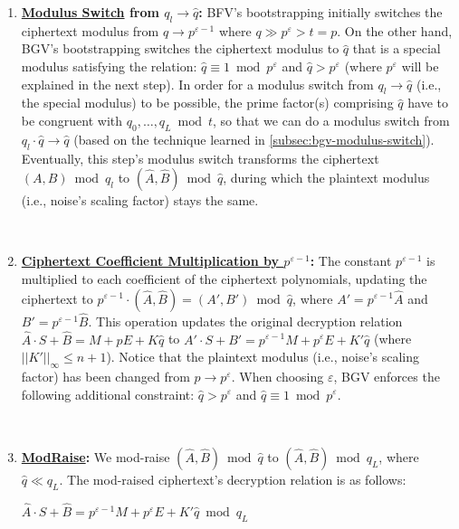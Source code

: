 \begin{enumerate}

\item \textbf{\underline{Modulus Switch} from \boldmath$q_l \rightarrow \hat{q}$:} BFV's bootstrapping initially switches the ciphertext modulus from $q \rightarrow p^{\varepsilon-1}$ where $q \gg p^\varepsilon > t = p$. On the other hand, BGV's bootstrapping switches the ciphertext modulus to $\hat{q}$ that is a special modulus satisfying the relation: $\hat{q} \equiv 1 \bmod p^\varepsilon$ and $\hat{q} > p^\varepsilon$ (where $p^\varepsilon$ will be explained in the next step). In order for a modulus switch from $q_l \rightarrow \hat{q}$ (i.e., the special modulus) to be possible, the prime factor(s) comprising $\hat{q}$ have to be congruent with $q_{0}, \ldots, q_L \bmod t$, so that we can do a modulus switch from $q_l\cdot \hat{q} \rightarrow \hat{q}$ (based on the technique learned in \autoref{subsec:bgv-modulus-switch}). Eventually, this step's modulus switch transforms the ciphertext $(A, B) \bmod q_l$ to $(\hat{A}, \hat{B}) \bmod \hat{q}$, during which the plaintext modulus (i.e., noise's scaling factor) stays the same. 

$ $

\item \textbf{\underline{Ciphertext Coefficient Multiplication by \boldmath$p^{\varepsilon-1}$}:} 
The constant $p^{\varepsilon-1}$ is multiplied to each coefficient of the ciphertext polynomials, updating the ciphertext to $p^{\varepsilon-1} \cdot (\hat{A}, \hat{B}) = (A', B') \bmod \hat{q}$, where $A' = p^{\varepsilon-1}\hat{A}$ and $B' = p^{\varepsilon-1}\hat{B}$. This operation updates the original decryption relation $\hat{A}\cdot S + \hat{B} = M + p E + K\hat{q}$ to $A'\cdot S + B' = p^{\varepsilon-1} M + p^\varepsilon E + K'\hat{q}$ (where $||K'||_{\infty} \leq n + 1$). Notice that the plaintext modulus (i.e., noise's scaling factor) has been changed from $p \rightarrow p^\varepsilon$. When choosing $\varepsilon$, BGV enforces the following additional constraint: $\hat{q} > p^\varepsilon$ and $\hat{q}  \equiv 1 \bmod p^\varepsilon$.

$ $

\item \textbf{\underline{\textsf{ModRaise}}:} We mod-raise $(\hat{A}, \hat{B}) \bmod \hat{q}$ to $(\hat{A}, \hat{B}) \bmod q_L$, where $\hat{q} \ll q_L$. The mod-raised ciphertext's decryption relation is as follows:

$\hat{A}\cdot S + \hat{B} = p^{\varepsilon-1}M + p^\varepsilon E + K'\hat{q} \bmod q_L$


\end{enumerate}
